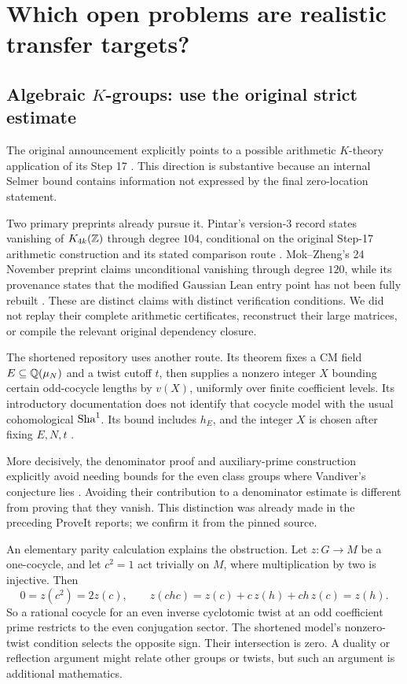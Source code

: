 \section{Which open problems are realistic transfer targets?}
\label{sec:targets}

\subsection{Algebraic \texorpdfstring{\(K\)}{K}-groups: use the original strict estimate}

The original announcement explicitly points to a possible arithmetic
\(K\)-theory application of its Step 17 \cite{announcement}. This direction
is substantive because an internal Selmer bound contains information not
expressed by the final zero-location statement.

Two primary preprints already pursue it. Pintar's version-3 record states
vanishing of \(K_{4k}(\mathbb Z)\) through degree \(104\), conditional on the
original Step-17 arithmetic construction and its stated comparison route
\cite{pintar}. Mok--Zheng's 24 November preprint claims unconditional
vanishing through degree \(120\), while its provenance states that the
modified Gaussian Lean entry point has not been fully rebuilt
\cite{mokzheng}. These are distinct claims with distinct verification
conditions. We did not replay their complete arithmetic certificates,
reconstruct their large matrices, or compile the relevant original
dependency closure.

The shortened repository uses another route. Its theorem
 fixes a CM field \(E\subseteq\mathbb Q(\mu_N)\)
and a twist cutoff \(t\), then supplies a nonzero integer \(X\) bounding
certain odd-cocycle lengths by \(v(X)\), uniformly over finite coefficient
levels. Its introductory documentation does not identify that cocycle
model with the usual cohomological \(\mathrm{Sha}^1\). Its bound includes \(h_E\),
and the integer \(X\) is chosen after fixing \(E,N,t\)
\cite{oddsha}.

More decisively, the denominator proof and auxiliary-prime construction
explicitly avoid needing bounds for the even class groups where
Vandiver's conjecture lies \cite{denominator,triangle}. Avoiding their
contribution to a denominator estimate is different from proving that
they vanish. This distinction was already made in the preceding ProveIt
reports; we confirm it from the pinned source.

An elementary parity calculation explains the obstruction. Let
\(z:G\to M\) be a one-cocycle, and let \(c^2=1\) act trivially on \(M\),
where multiplication by two is injective. Then
\[
 0=z(c^2)=2z(c),\qquad
 z(chc)=z(c)+c\,z(h)+ch\,z(c)=z(h).
\]
So a rational cocycle for an even inverse cyclotomic twist at an odd
coefficient prime restricts to the even conjugation sector. The
shortened model's nonzero-twist condition selects the opposite sign.
Their intersection is zero. A duality or reflection argument might relate
other groups or twists, but such an argument is additional mathematics.


